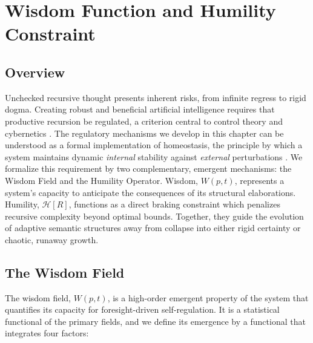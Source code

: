 \chapter{Wisdom Function and Humility Constraint}
\label{8:wisdom_function_and_humility_constraint}


\section{Overview}
\label{8.1:overview}

Unchecked recursive thought presents inherent risks, from infinite regress to rigid dogma. Creating robust and beneficial artificial intelligence requires that productive recursion be regulated, a criterion central to control theory and cybernetics \autocite{Kalman1960, AndersonMoore1990, Wiener1948, Ashby1952, RussellDeweyTegmark2015}. The regulatory mechanisms we develop in this chapter can be understood as a formal implementation of homeostasis, the principle by which a system maintains dynamic \textit{internal} stability against \textit{external} perturbations \autocite{Cannon1932}. We formalize this requirement by two complementary, emergent mechanisms: the Wisdom Field and the Humility Operator. Wisdom, \(W(p,t)\), represents a system's capacity to anticipate the consequences of its structural elaborations. Humility, \(\mathcal{H}[R]\), functions as a direct braking constraint which penalizes recursive complexity beyond optimal bounds. Together, they guide the evolution of adaptive semantic structures away from collapse into either rigid certainty or chaotic, runaway growth.


\section{The Wisdom Field}
\label{8.2:the_wisdom_field}

The wisdom field, \(W(p, t)\), is a high-order emergent property of the system that quantifies its capacity for foresight-driven self-regulation. It is a statistical functional of the primary fields, and we define its emergence by a functional that integrates four factors:

